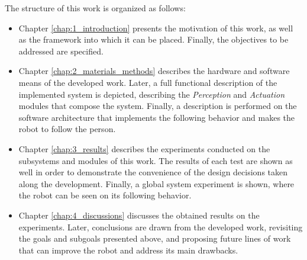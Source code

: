 The structure of this work is organized as follows:
\begin{itemize}
	\item Chapter \ref{chap:1_introduction} presents the motivation of this work, as well as the framework into which it can be placed. Finally, the objectives to be addressed are specified.
	\item Chapter \ref{chap:2_materials_methods} describes the hardware and software means of the developed work. Later, a full functional description of the implemented system is depicted, describing the \textit{Perception} and \textit{Actuation} modules that compose the system. Finally, a description is performed on the software architecture that implements the following behavior and makes the robot to follow the person.
	\item Chapter \ref{chap:3_results} describes the experiments conducted on the subsystems and modules of this work. The results of each test are shown as well in order to demonstrate the convenience of the design decisions taken along the development. Finally, a global system experiment is shown, where the robot can be seen on its following behavior.
	\item Chapter \ref{chap:4_discussions} discusses the obtained results on the experiments. Later, conclusions are drawn from the developed work, revisiting the goals and subgoals presented above, and proposing future lines of work that can improve the robot and address its main drawbacks.
\end{itemize}


